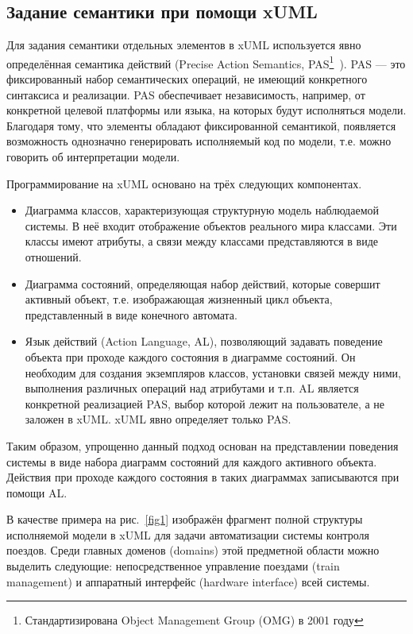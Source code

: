 \documentclass[a5paper]{article}
\begin{document}
\subsection{Задание семантики при помощи xUML}

Для задания семантики отдельных элементов в xUML используется явно определённая семантика действий (Precise Action Semantics, PAS\footnote{Стандартизирована Object Management Group (OMG) в 2001 году}~\cite{xuml3}). PAS --- это фиксированный набор семантических операций, не имеющий конкретного синтаксиса и реализации. PAS обеспечивает независимость, например, от конкретной целевой платформы или языка, на которых будут исполняться модели. Благодаря тому, что элементы обладают фиксированной семантикой, появляется возможность однозначно генерировать исполняемый код по модели, т.е. можно говорить об интерпретации модели.

Программирование на  xUML основано на трёх следующих компонентах.
\begin{itemize}
 \item Диаграмма классов, характеризующая структурную модель наблюдаемой системы. В неё входит отображение объектов реального мира классами. Эти классы имеют атрибуты, а связи между классами представляются в виде отношений.
 \item Диаграмма состояний, определяющая набор действий, которые совершит активный объект, т.е. изображающая жизненный цикл объекта, представленный в виде конечного автомата.
 \item Язык действий (Action Language, AL), позволяющий задавать поведение объекта при проходе каждого состояния в диаграмме состояний. Он необходим для создания экземпляров классов, установки связей между ними, выполнения различных операций над атрибутами и т.п. AL является конкретной реализацией PAS, выбор которой лежит на пользователе, а не заложен в xUML. xUML явно определяет только PAS.
\end{itemize}

Таким образом, упрощенно данный подход основан на представлении поведения системы в виде набора диаграмм состояний для каждого активного объекта. Действия при проходе каждого состояния в таких диаграммах записываются при помощи AL.

В качестве примера на рис.~\ref{fig1} изображён фрагмент полной структуры исполняемой модели в xUML для задачи автоматизации системы контроля поездов. Среди главных доменов (domains) этой предметной области можно выделить следующие: непосредственное управление поездами (train management) и аппаратный интерфейс (hardware interface) всей системы.
\end{document}
